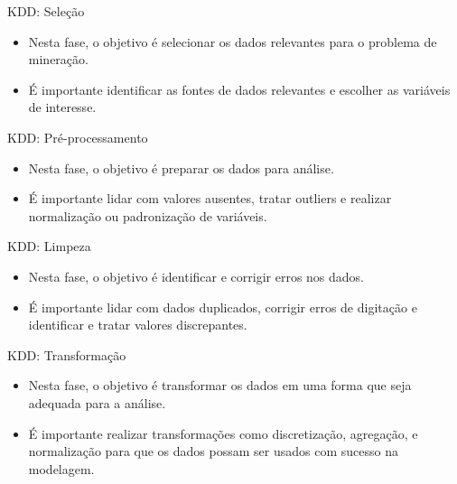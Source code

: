 \documentclass[
  ignorenonframetext,
  aspectratio=169,
]{beamer}
\providecommand{\tightlist}{%
  \setlength{\itemsep}{0pt}\setlength{\parskip}{0pt}}
\begin{document}
\begin{frame}{KDD: Seleção}
\label{kdd-seleuxe7uxe3o}
\begin{itemize}
\tightlist
\item
  Nesta fase, o objetivo é selecionar os dados relevantes para o
  problema de mineração.
\end{itemize}

\pause

\begin{itemize}
\tightlist
\item
  É importante identificar as fontes de dados relevantes e escolher as
  variáveis de interesse.
\end{itemize}
\end{frame}

\begin{frame}{KDD: Pré-processamento}
\label{kdd-pruxe9-processamento}
\begin{itemize}
\tightlist
\item
  Nesta fase, o objetivo é preparar os dados para análise.
\end{itemize}

\pause

\begin{itemize}
\tightlist
\item
  É importante lidar com valores ausentes, tratar outliers e realizar
  normalização ou padronização de variáveis.
\end{itemize}
\end{frame}

\begin{frame}{KDD: Limpeza}
\label{kdd-limpeza}
\begin{itemize}
\tightlist
\item
  Nesta fase, o objetivo é identificar e corrigir erros nos dados.
\end{itemize}

\pause

\begin{itemize}
\tightlist
\item
  É importante lidar com dados duplicados, corrigir erros de digitação e
  identificar e tratar valores discrepantes.
\end{itemize}
\end{frame}

\begin{frame}{KDD: Transformação}
\label{kdd-transformauxe7uxe3o}
\begin{itemize}
\tightlist
\item
  Nesta fase, o objetivo é transformar os dados em uma forma que seja
  adequada para a análise.
\end{itemize}

\pause

\begin{itemize}
\tightlist
\item
  É importante realizar transformações como discretização, agregação, e
  normalização para que os dados possam ser usados com sucesso na
  modelagem.
\end{itemize}
\end{frame}
\end{document}
